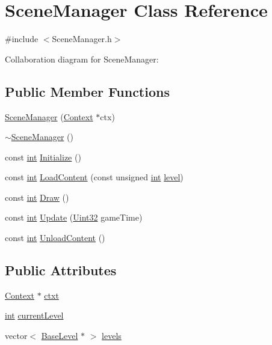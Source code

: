 \hypertarget{class_scene_manager}{\section{Scene\-Manager Class Reference}
\label{class_scene_manager}
}


{\ttfamily \#include $<$Scene\-Manager.\-h$>$}



Collaboration diagram for Scene\-Manager\-:
\subsection*{Public Member Functions}
\begin{DoxyCompactItemize}
\item 
\hyperlink{class_scene_manager_ac154819aef6b4ac0cf874da92e8c6240}{Scene\-Manager} (\hyperlink{class_context}{Context} $\ast$ctx)
\item 
\hyperlink{class_scene_manager_a2bb376a85d29e85f47753e26c7539229}{$\sim$\-Scene\-Manager} ()
\item 
const \hyperlink{_s_d_l__thread_8h_a6a64f9be4433e4de6e2f2f548cf3c08e}{int} \hyperlink{class_scene_manager_a9dad0dc208908a5fd8fec0b93650a3ca}{Initialize} ()
\item 
const \hyperlink{_s_d_l__thread_8h_a6a64f9be4433e4de6e2f2f548cf3c08e}{int} \hyperlink{class_scene_manager_a59b73b33e2cca96390df34f8383f015f}{Load\-Content} (const unsigned \hyperlink{_s_d_l__thread_8h_a6a64f9be4433e4de6e2f2f548cf3c08e}{int} \hyperlink{_g_l_e_w_2glew_8h_aeb776e5e0b0aff9ecb4c615ec0d92452}{level})
\item 
const \hyperlink{_s_d_l__thread_8h_a6a64f9be4433e4de6e2f2f548cf3c08e}{int} \hyperlink{class_scene_manager_aeaa026868167165b57d6e7f30f3b245e}{Draw} ()
\item 
const \hyperlink{_s_d_l__thread_8h_a6a64f9be4433e4de6e2f2f548cf3c08e}{int} \hyperlink{class_scene_manager_aa624b9af24ca279362c6927bfa55fda0}{Update} (\hyperlink{_s_d_l__stdinc_8h_add440eff171ea5f55cb00c4a9ab8672d}{Uint32} game\-Time)
\item 
const \hyperlink{_s_d_l__thread_8h_a6a64f9be4433e4de6e2f2f548cf3c08e}{int} \hyperlink{class_scene_manager_a2be31c96e1d383ad3b0169fc09b2494a}{Unload\-Content} ()
\end{DoxyCompactItemize}
\subsection*{Public Attributes}
\begin{DoxyCompactItemize}
\item 
\hyperlink{class_context}{Context} $\ast$ \hyperlink{class_scene_manager_a611a4d783fd9d9a6decc2ba181bdd1cb}{ctxt}
\item 
\hyperlink{_s_d_l__thread_8h_a6a64f9be4433e4de6e2f2f548cf3c08e}{int} \hyperlink{class_scene_manager_aba5eaf1361847ce13d513bca98209ce7}{current\-Level}
\item 
vector$<$ \hyperlink{class_base_level}{Base\-Level} $\ast$ $>$ \hyperlink{class_scene_manager_a85055be131b6d2502a57981bf61e1603}{levels}
\end{DoxyCompactItemize}


